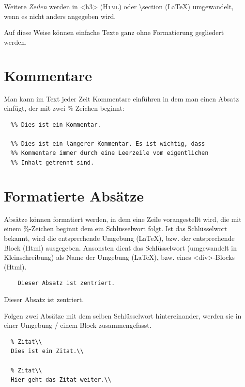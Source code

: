 \documentclass{scrartcl}
\begin{document}
Weitere \emph{Zeilen} werden in <h3> (\textsc{Html}) oder \textbackslash section
(LaTeX) umgewandelt, wenn es nicht anders angegeben wird.

Auf diese Weise können einfache Texte ganz ohne Formatierung
gegliedert werden.

\section{Kommentare}

Man kann im Text jeder Zeit Kommentare einführen in dem man einen Absatz einfügt, der mit zwei \%-Zeichen beginnt:

\begin{verbatim}
  %% Dies ist ein Kommentar.

  %% Dies ist ein längerer Kommentar. Es ist wichtig, dass
  %% Kommentare immer durch eine Leerzeile vom eigentlichen
  %% Inhalt getrennt sind.

\end{verbatim}



\section{Formatierte Absätze}

\colorbox{grau}{\parbox{\linewidth}{%
Absätze können formatiert werden, in dem eine Zeile
vorangestellt wird, die mit einem \%-Zeichen beginnt dem ein
Schlüsselwort folgt. Ist das Schlüsselwort bekannt, wird
die entsprechende Umgebung (LaTeX), bzw. der entsprechende
Block (Html) ausgegeben. Ansonsten dient das Schlüsselwort
(umgewandelt in Kleinschreibung) als Name der Umgebung
(LaTeX), bzw. eines <div>-Blocks (Html).
}}

\begin{verbatim}
	Dieser Absatz ist zentriert.

\end{verbatim}

\begin{center}
Dieser Absatz ist zentriert.

\end{center}

Folgen zwei Absätze mit dem selben Schlüsselwort
hintereinander, werden sie in einer Umgebung / einem Block
zusammengefasst.

\begin{verbatim}
  % Zitat\\
  Dies ist ein Zitat.\\

  % Zitat\\
  Hier geht das Zitat weiter.\\

\end{verbatim}
\end{document}
